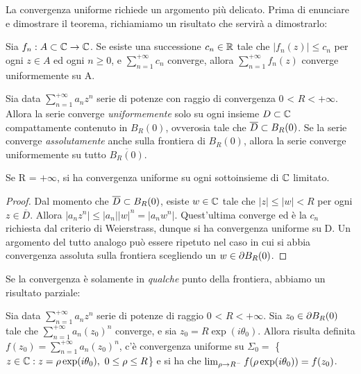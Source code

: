 \documentclass[Completo.tex]{subfiles}
\begin{document}
La convergenza uniforme richiede un argomento più delicato. Prima di enunciare e dimostrare il teorema, richiamiamo un risultato che servirà a dimostrarlo:
\begin{Lemma}
	Sia $f_n: A \sset \bb[C] \ra \bb[C]$. Se esiste una successione $c_n \in \bb[R]$ tale che $\vert f_n(z) \vert \leq c_n$ per ogni $z \in A$ ed ogni $n \geq 0$, e $\sum_{n = 1}^{+\infty} c_n$ converge, allora $\sum_{n=1}^{+\infty} f_n(z)$ converge uniformemente su A.
\end{Lemma}
\begin{eTh}
	Sia data $\sum_{n=1}^{+\infty} a_n z^n$ serie di potenze con raggio di convergenza 0 < $R < +\infty$. Allora la serie converge \textit{uniformemente} solo su ogni insieme $D \sset \bb[C]$ compattamente contenuto in $B_R(0)$, ovverosia tale che $\overline{D} \subset B_R(0)$. Se la serie converge \textit{assolutamente} anche sulla frontiera di $B_R(0)$, allora la serie converge uniformemente su tutto $\overline{B_R(0)}$.
\end{eTh}
\begin{Oss}
	Se R = $+\infty$, si ha convergenza uniforme su ogni sottoinsieme di $\bb[C]$ limitato.
\end{Oss}
\begin{proof}
	Dal momento che $\overline{D} \subset B_R(0)$, esiste $w \in \bb[C]$ tale che $\vert z \vert \leq \vert w \vert < R$ per ogni $z \in \overline{D}$. Allora $\vert a_n z^n \vert \leq \vert a_n \vert \vert w \vert^n = \vert a_n w^n \vert$. Quest'ultima converge ed è la $c_n$ richiesta dal criterio di Weierstrass, dunque si ha convergenza uniforme su D. Un argomento del tutto analogo può essere ripetuto nel caso in cui si abbia convergenza assoluta sulla frontiera scegliendo un $w \in \partial B_R(0)$.
\end{proof}
Se la convergenza è solamente in \textit{qualche} punto della frontiera, abbiamo un risultato parziale:
\begin{eTh}[Abel]
	Sia data $\sum_{n=1}^{+\infty} a_n z^n$ serie di potenze di raggio 0 < $R < +\infty$. Sia $z_0 \in \partial B_R(0)$ tale che $\sum_{n=1}^{+\infty} a_n (z_0)^n$ converge, e sia $z_0 = R\exp(i\theta_0)$. Allora risulta definita $f(z_0) = \sum_{n=1}^{+\infty} a_n (z_0)^n$, c'è convergenza uniforme su $\Sigma_0 =$ \{$z \in \bb[C]: z = \rho\exp(i\theta_0), \ 0 \leq \rho \leq R$\} e si ha che $\lim_{\rho \rightarrow R^{-}} f(\rho\exp(i\theta_0)) = f(z_0)$.
\end{eTh}
\end{document}

